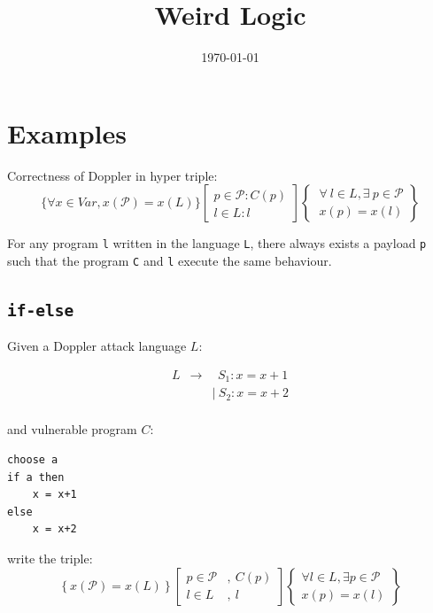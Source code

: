 \documentclass[12pt]{article}
\title{Weird Logic}
\date{\today}
\begin{document}
\maketitle

\section{Examples}
Correctness of Doppler in hyper triple:
\[
\{ \forall x \in Var, x(\mathcal{P}) = x(L) \} 
\left[ \begin{array}{l} p \in \mathcal{P} : C(p) \\ l \in L : l\end{array} \right] 
\left\{ 
\begin{array}{l}
~ \forall ~l \in L, \exists ~p \in \mathcal{P} \\
~ x(p) = x(l) \end{array}\right\}
\]

For any program \texttt{l} written in the language \texttt{L}, there always exists a payload \texttt{p} such that the program \texttt{C} and \texttt{l} execute the same behaviour.




\subsection{\texttt{if-else}}
Given a Doppler attack language $L$:

\[
\begin{array}{rrl}
     L & \rightarrow & ~~S_1 : x=x+1 \\
       &   & |~S_2 : x=x+2 \\
\end{array}
\]

and vulnerable program $C$:
\begin{lstlisting}
choose a
if a then
    x = x+1
else
    x = x+2
\end{lstlisting}

write the triple: 
\[
\left\{ x(\mathcal{P}) = x(L) \right\}
\left[
\begin{array}{ll}
p \in \mathcal{P} & , ~C(p) \\
l \in L & , ~l
\end{array}
\right]
\left\{
\begin{array}{c}
\forall l \in L , \exists p \in \mathcal{P} \\
x(p) = x(l)
\end{array}
\right\}
\]
\end{document}
